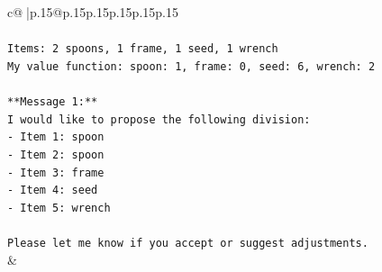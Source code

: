 \documentclass{article}
\begin{document}
{\begin{supertabular}{c@{$\;$}|p{.15\linewidth}@{}p{.15\linewidth}p{.15\linewidth}p{.15\linewidth}p{.15\linewidth}p{.15\linewidth}}
{{{\\ 
\\ 
\texttt{Items: 2 spoons, 1 frame, 1 seed, 1 wrench  } \\
\texttt{My value function: spoon: 1, frame: 0, seed: 6, wrench: 2  } \\
\\ 
\texttt{**Message 1:**  } \\
\texttt{I would like to propose the following division:  } \\
\texttt{{-} Item 1: spoon  } \\
\texttt{{-} Item 2: spoon  } \\
\texttt{{-} Item 3: frame  } \\
\texttt{{-} Item 4: seed  } \\
\texttt{{-} Item 5: wrench  } \\
\\ 
\texttt{Please let me know if you accept or suggest adjustments.} \\
            }
        }
    }
    & \\ \\


\end{supertabular}}
\end{document}
